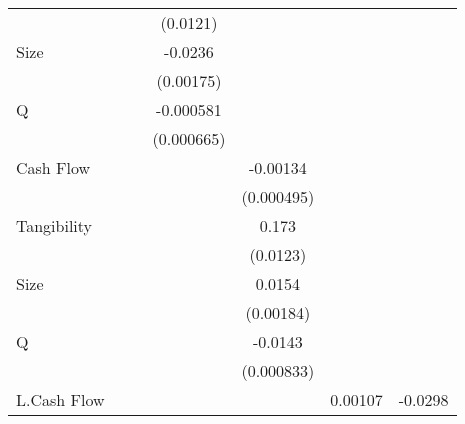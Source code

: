 {\begin{tabular}{l*{6}{c}}
                    &                     &                     &    (0.0121)         &                     &                     &                     \\
[1em]
Size                &                     &                     &     -0.0236\sym{***}&                     &                     &                     \\
                    &                     &                     &   (0.00175)         &                     &                     &                     \\
[1em]
Q                   &                     &                     &   -0.000581         &                     &                     &                     \\
                    &                     &                     &  (0.000665)         &                     &                     &                     \\
[1em]
Cash Flow           &                     &                     &                     &    -0.00134\sym{**} &                     &                     \\
                    &                     &                     &                     &  (0.000495)         &                     &                     \\
[1em]
Tangibility         &                     &                     &                     &       0.173\sym{***}&                     &                     \\
                    &                     &                     &                     &    (0.0123)         &                     &                     \\
[1em]
Size                &                     &                     &                     &      0.0154\sym{***}&                     &                     \\
                    &                     &                     &                     &   (0.00184)         &                     &                     \\
[1em]
Q                   &                     &                     &                     &     -0.0143\sym{***}&                     &                     \\
                    &                     &                     &                     &  (0.000833)         &                     &                     \\
[1em]
L.Cash Flow         &                     &                     &                     &                     &     0.00107         &     -0.0298\sym{***}\\

\end{tabular}}
